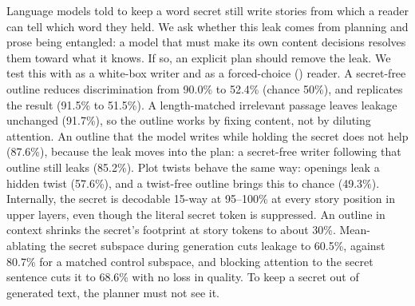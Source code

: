 Language models told to keep a word secret still write stories from which a reader can tell which word they held. We ask whether this leak comes from planning and prose being entangled: a model that must make its own content decisions resolves them toward what it knows. If so, an explicit plan should remove the leak. We test this with \gemma as a white-box writer and \judge as a forced-choice (\twoafc) reader. A secret-free outline reduces discrimination from 90.0\% to 52.4\% (chance 50\%), and \gemmabig replicates the result (91.5\% to 51.5\%). A length-matched irrelevant passage leaves leakage unchanged (91.7\%), so the outline works by fixing content, not by diluting attention. An outline that the model writes while holding the secret does not help (87.6\%), because the leak moves into the plan: a secret-free writer following that outline still leaks (85.2\%). Plot twists behave the same way: openings leak a hidden twist (57.6\%), and a twist-free outline brings this to chance (49.3\%). Internally, the secret is decodable 15-way at 95--100\% at every story position in upper layers, even though the literal secret token is suppressed. An outline in context shrinks the secret's footprint at story tokens to about 30\%. Mean-ablating the secret subspace during generation cuts leakage to 60.5\%, against 80.7\% for a matched control subspace, and blocking attention to the secret sentence cuts it to 68.6\% with no loss in quality. To keep a secret out of generated text, the planner must not see it.
